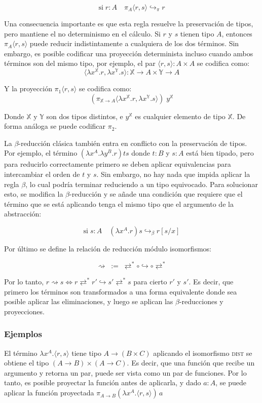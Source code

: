 \[ \text{si} \; r:A \quad \pi_A \langle r, s \rangle \hookrightarrow_{\pi} r \]

Una consecuencia importante es que esta regla resuelve la preservación de tipos, pero mantiene el no determinismo en el cálculo.
Si $r$ y $s$ tienen tipo $A$, entonces $\pi_A \langle r, s \rangle$ puede reducir indistintamente a cualquiera de los dos términos.
Sin embargo, es posible codificar una proyección determinista incluso cuando ambos términos son del mismo tipo, por ejemplo, el par $\langle r, s \rangle: A \times A$
se codifica como:
\[ \langle \lambda x^\mathbb{X}.r, \lambda x^\mathbb{Y}.s \rangle : \mathbb{X} \rightarrow A \times \mathbb{Y} \rightarrow A \]

Y la proyección $\pi_1 \langle r, s \rangle$ se codifica como:
\[ (\pi_{\mathbb{X} \rightarrow A} \langle \lambda x^\mathbb{X}.r, \lambda x^\mathbb{Y}.s \rangle)\; y^\mathbb{X} \]

Donde $\mathbb{X}$ y $\mathbb{Y}$ son dos tipos distintos, e $y^\mathbb{X}$ es cualquier elemento de tipo $\mathbb{X}$.
De forma análoga se puede codificar $\pi_2$.


La $\beta$-reducción clásica también entra en conflicto con la preservación de tipos.
Por ejemplo, el término $(\lambda x^A . \lambda y^B . r)ts$ donde $t:B$ y $s:A$ está bien tipado, pero para reducirlo correctamente primero se deben aplicar equivalencias para intercambiar el orden de $t$ y $s$.
Sin embargo, no hay nada que impida aplicar la regla $\beta$, lo cual podría terminar reduciendo a un tipo equivocado.
Para solucionar esto, se modifica la $\beta$-reducción y se añade una condición que requiere que el término que se está aplicando tenga el mismo tipo que el argumento de la abstracción:

\[ \text{si} \; s:A \quad (\lambda x^A.r) s \hookrightarrow_{\beta} r[s/x] \]


Por último se define la relación de reducción módulo isomorfismos:

\[ \rightsquigarrow \; := \; \rightleftarrows^* \circ \hookrightarrow \circ \rightleftarrows^* \]

Por lo tanto, $r \rightsquigarrow s \iff r \rightleftarrows^* r' \hookrightarrow s' \rightleftarrows^* s$ para cierto $r'$ y $s'$. Es decir, que primero los términos son transformados a una forma equivalente donde sea posible aplicar las eliminaciones, y luego se aplican las $\beta$-reducciones y proyecciones.

\subsubsection{Ejemplos}
El término $\lambda x^A. \langle r,s \rangle$ tiene tipo $A \rightarrow (B \times C)$ aplicando el isomorfismo \textsc{dist} se obtiene el tipo $(A \rightarrow B) \times (A \rightarrow C)$.
Es decir, que una función que recibe un argumento y retorna un par, puede ser vista como un par de funciones.
Por lo tanto, es posible proyectar la función antes de aplicarla, y dado $a: A$, se puede aplicar la función proyectada $\pi_{A \rightarrow B}(\lambda x^A . \langle r,s \rangle)\, a$

